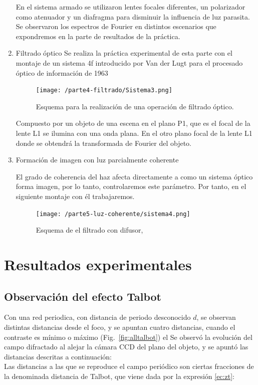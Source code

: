 \documentclass{./packages/optica-article}
\begin{document}
\begin{enumerate}
En el sistema armado se utilizaron lentes focales diferentes, un polarizador como atenuador y un diafragma para disminuir la influencia de luz parasita.\\
Se observaron los espectros de Fourier en distintos escenarios que expondremos en la parte de resultados de la práctica.
    \item Filtrado óptico
Se realiza la práctica experimental de esta parte con el montaje de un sistema 4f introducido por Van der Lugt para el procesado óptico de información de 1963

\begin{figure}[h]
    \centering
    \texttt{[image: /parte4-filtrado/Sistema3.png]}
    \caption{Esquema para la realización de una operación de filtrado óptico.}
    \label{filtradoopticosistema}
    \end{figure}
    
Compuesto por un objeto de una escena en el plano P1, que es el focal de la lente L1 se ilumina con una onda plana. En el otro plano focal de la lente L1 donde se obtendrá la transformada de Fourier del objeto.

    \item Formación de imagen con luz parcialmente coherente

El grado de coherencia del haz afecta directamente a como un sistema óptico forma imagen, por lo tanto, controlaremos este parámetro. Por tanto, en el siguiente montaje con él trabajaremos.

\begin{figure}[h]
    \centering
    \texttt{[image: /parte5-luz-coherente/sistema4.png]}
    \caption{Esquema de el filtrado con difusor, }
    \label{coherenciaespacial}
    \end{figure}

\end{enumerate}

\section{Resultados experimentales}

\subsection{Observación del efecto Talbot}
Con una red periodica, con distancia de periodo desconocido $d$, se observan  distintas distancias desde el foco, y se apuntan cuatro distancias, cuando el contraste es mínimo o máximo (Fig.~\ref{fig:alltalbot}) el Se observó la evolución del campo difractado al alejar la cámara CCD del plano del objeto, y se apuntó las distancias descritas a continuación:\\
Las distancias a las que se reproduce el campo periódico son ciertas fracciones de la denominada distancia de Talbot, que viene dada por la expresión \ref{ec:zt}:
\end{document}
